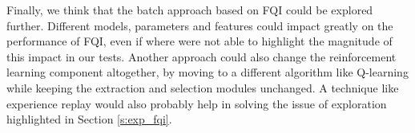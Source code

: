Finally, we think that the batch approach based on FQI could be explored further. 
Different models, parameters and features could impact greatly 
on the performance of FQI, even if where were not able to highlight the 
magnitude of this impact in our tests. 
Another approach could also change the reinforcement learning component 
altogether, by moving to a different algorithm like Q-learning while keeping
the extraction and selection modules unchanged. A technique like experience 
replay would also probably help in solving the issue of exploration highlighted 
in Section \ref{s:exp_fqi}.


